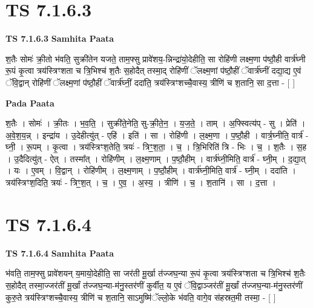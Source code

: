 \documentclass[17pt]{extarticle}
\begin{document}
\section{ TS 7.1.6.3 }

\textbf{TS 7.1.6.3 } \newline
\textbf{Samhita Paata} \newline

श॒तैः सोमः॑ क्री॒तो भ॑वति॒ सुक्री॑तेन यजते॒ ताम॒फ्सु प्रावे॑शय॒-न्निन्द्रा॑यो॒देहीति॒ सा रोहि॑णी लक्ष्म॒णा प॑ष्ठौ॒ही वार्त्र॑घ्नी रू॒पं कृ॒त्वा त्रय॑स्त्रिꣳशता च त्रि॒भिश्च॑ श॒तैः स॒होदैत् तस्मा॒द् रोहि॑णीं ॅलक्ष्म॒णां प॑ष्ठौ॒हीं ॅवार्त्र॑घ्नीं दद्या॒द्य ए॒वं ॅवि॒द्वान् रोहि॑णीं ॅलक्ष्म॒णां प॑ष्ठौ॒हीं ॅवार्त्र॑घ्नीं॒ ददा॑ति॒ त्रय॑स्त्रिꣳशच्चै॒वास्य॒ त्रीणि॑ च श॒तानि॒ सा द॒त्ता - [  ] \newline

\textbf{Pada Paata} \newline

श॒तैः । सोमः॑ । क्री॒तः । भ॒व॒ति॒ । सुक्री॑ते॒नेति॒ सु-क्री॒ते॒न॒ । य॒ज॒ते॒ । ताम् । अ॒फ्स्वित्य॑प् - सु । प्रेति॑ । अ॒वे॒श॒य॒न्न् । इन्द्रा॑य । उ॒देहीत्यु॑त् - एहि॑ । इति॑ । सा । रोहि॑णी । ल॒क्ष्म॒णा । प॒ष्ठौ॒ही । वार्त्र॒घ्नीति॒ वार्त्र॑ - घ्नी॒ । रू॒पम् । कृ॒त्वा । त्रय॑स्त्रिꣳश॒तेति॒ त्रयः॑ - त्रिꣳ॒॒श॒ता॒ । च॒ । त्रि॒भिरिति॑ त्रि - भिः । च॒ । श॒तैः । स॒ह । उ॒दैदित्यु॑त् - ऐत् । तस्मा᳚त् । रोहि॑णीम् । ल॒क्ष्म॒णाम् । प॒ष्ठौ॒हीम् । वार्त्र॑घ्नी॒मिति॒ वार्त्र॑ - घ्नी॒म् । द॒द्या॒त् । यः । ए॒वम् । वि॒द्वान् । रोहि॑णीम् । ल॒क्ष्म॒णाम् । प॒ष्ठौ॒हीम् । वार्त्र॑घ्नी॒मिति॒ वार्त्र॑ - घ्नी॒म् । ददा॑ति । त्रय॑स्त्रिꣳश॒दिति॒ त्रयः॑ - त्रिꣳ॒॒श॒त् । च॒ । ए॒व॒ । अ॒स्य॒ । त्रीणि॑ । च॒ । श॒तानि॑ । सा । द॒त्ता ।  \newline





\section{ TS 7.1.6.4 }

\textbf{TS 7.1.6.4 } \newline
\textbf{Samhita Paata} \newline

भ॑वति॒ ताम॒फ्सु प्रावे॑शयन् य॒मायो॒देहीति॒ सा जर॑ती मू॒र्खा त॑ज्जघ॒न्या रू॒पं कृ॒त्वा त्रय॑स्त्रिꣳशता च त्रि॒भिश्च॑ श॒तैः स॒होदैत् तस्मा॒ज्जर॑तीं मू॒र्खां त॑ज्जघ॒न्या-म॑नु॒स्तर॑णीं कुर्वीत॒ य ए॒वं ॅवि॒द्वाञ्जर॑तीं मू॒र्खां त॑ज्जघ॒न्या-म॑नु॒स्तर॑णीं कुरु॒ते त्रय॑स्त्रिꣳशच्चै॒वास्य॒ त्रीणि॑ च श॒तानि॒ साऽमुष्मि॑ॅल्लो॒के भ॑वति॒ वागे॒व स॑हस्रत॒मी तस्मा॒ - [  ] \newline
\end{document}
